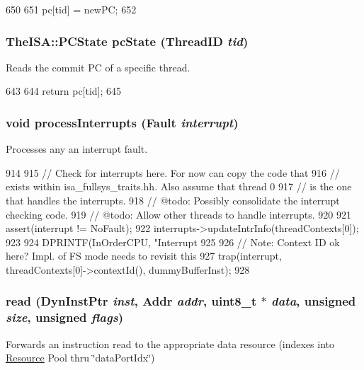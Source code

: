 \begin{DoxyCode}
650     {
651         pc[tid] = newPC;
652     }
\end{DoxyCode}
\hypertarget{classInOrderCPU_af486ac7476906f63fc6696b3e76a411b}{
\subsubsection[{pcState}]{\setlength{\rightskip}{0pt plus 5cm}TheISA::PCState pcState ({\bf ThreadID} {\em tid})}}
\label{classInOrderCPU_af486ac7476906f63fc6696b3e76a411b}
Reads the commit PC of a specific thread. 


\begin{DoxyCode}
643     {
644         return pc[tid];
645     }
\end{DoxyCode}
\hypertarget{classInOrderCPU_ac3b13f31ae4a2de2b647e09c37a10822}{
\subsubsection[{processInterrupts}]{\setlength{\rightskip}{0pt plus 5cm}void processInterrupts ({\bf Fault} {\em interrupt})}}
\label{classInOrderCPU_ac3b13f31ae4a2de2b647e09c37a10822}
Processes any an interrupt fault. 


\begin{DoxyCode}
914 {
915     // Check for interrupts here.  For now can copy the code that
916     // exists within isa_fullsys_traits.hh.  Also assume that thread 0
917     // is the one that handles the interrupts.
918     // @todo: Possibly consolidate the interrupt checking code.
919     // @todo: Allow other threads to handle interrupts.
920 
921     assert(interrupt != NoFault);
922     interrupts->updateIntrInfo(threadContexts[0]);
923 
924     DPRINTF(InOrderCPU, "Interrupt %
925 
926     // Note: Context ID ok here? Impl. of FS mode needs to revisit this
927     trap(interrupt, threadContexts[0]->contextId(), dummyBufferInst);
928 }
\end{DoxyCode}
\hypertarget{classInOrderCPU_ac48fe45ef23fddfa02b5136cda4c060e}{
\subsubsection[{read}]{ read ({\bf DynInstPtr} {\em inst}, \/  {\bf Addr} {\em addr}, \/  uint8\_\-t $\ast$ {\em data}, \/  unsigned {\em size}, \/  unsigned {\em flags})}}
\label{classInOrderCPU_ac48fe45ef23fddfa02b5136cda4c060e}
Forwards an instruction read to the appropriate data resource (indexes into \hyperlink{classResource}{Resource} Pool thru \char`\"{}dataPortIdx\char`\"{}) 


